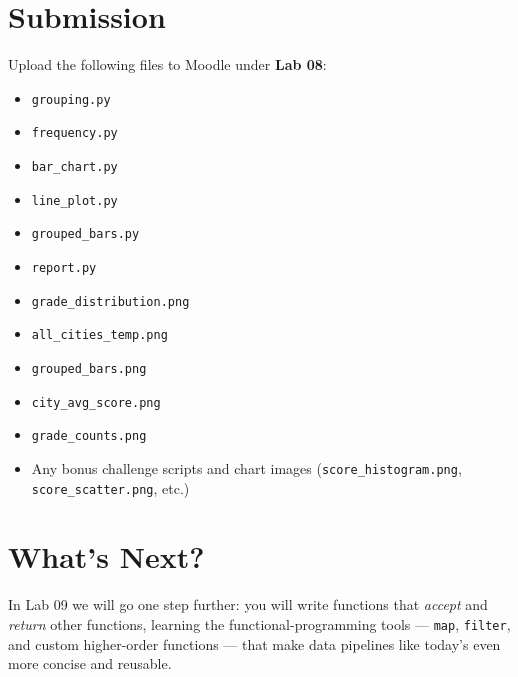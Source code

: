 \documentclass{cslab}
\begin{document}
\section{Submission}

Upload the following files to Moodle under \textbf{Lab 08}:

\begin{itemize}
    \item \texttt{grouping.py}
    \item \texttt{frequency.py}
    \item \texttt{bar\_chart.py}
    \item \texttt{line\_plot.py}
    \item \texttt{grouped\_bars.py}
    \item \texttt{report.py}
    \item \texttt{grade\_distribution.png}
    \item \texttt{all\_cities\_temp.png}
    \item \texttt{grouped\_bars.png}
    \item \texttt{city\_avg\_score.png}
    \item \texttt{grade\_counts.png}
    \item Any bonus challenge scripts and chart images (\texttt{score\_histogram.png}, \texttt{score\_scatter.png}, etc.)
\end{itemize}

\section{What's Next?}

In Lab 09 we will go one step further: you will write functions that \emph{accept} and \emph{return} other functions, learning the functional-programming tools --- \texttt{map}, \texttt{filter}, and custom higher-order functions --- that make data pipelines like today's even more concise and reusable.
\end{document}
